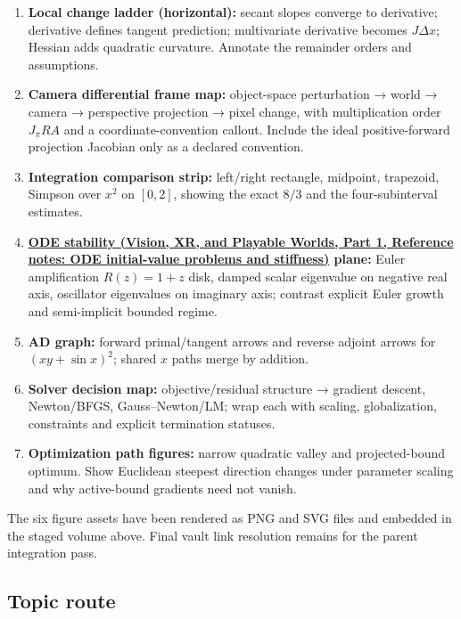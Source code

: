 \hypertarget{appendix-adf48f5dc5c1-figure-guide}{}

\begin{enumerate}
\def\labelenumi{\arabic{enumi}.}
\tightlist
\item
  \textbf{Local change ladder (horizontal):} secant slopes converge to derivative; derivative defines tangent prediction; multivariate derivative becomes \(J\Delta x\); Hessian adds quadratic curvature. Annotate the remainder orders and assumptions.
\item
  \textbf{Camera differential frame map:} object-space perturbation → world → camera → perspective projection → pixel change, with multiplication order \(J_\pi R A\) and a coordinate-convention callout. Include the ideal positive-forward projection Jacobian only as a declared convention.
\item
  \textbf{Integration comparison strip:} left/right rectangle, midpoint, trapezoid, Simpson over \(x^2\) on \([0,2]\), showing the exact \(8/3\) and the four-subinterval estimates.
\item
  \textbf{\href{../07-Vision-XR-and-Playable-Worlds-P01/main.pdf\#nameddest=appendix-e8ab9836882e}{ODE stability (Vision, XR, and Playable Worlds, Part 1, Reference notes: ODE initial-value problems and stiffness)} plane:} Euler amplification \(R(z)=1+z\) disk, damped scalar eigenvalue on negative real axis, oscillator eigenvalues on imaginary axis; contrast explicit Euler growth and semi-implicit bounded regime.
\item
  \textbf{AD graph:} forward primal/tangent arrows and reverse adjoint arrows for \((xy+\sin x)^2\); shared \(x\) paths merge by addition.
\item
  \textbf{Solver decision map:} objective/residual structure → gradient descent, Newton/BFGS, Gauss--Newton/LM; wrap each with scaling, globalization, constraints and explicit termination statuses.
\item
  \textbf{Optimization path figures:} narrow quadratic valley and projected-bound optimum. Show Euclidean steepest direction changes under parameter scaling and why active-bound gradients need not vanish.
\end{enumerate}

The six figure assets have been rendered as PNG and SVG files and embedded in the staged volume above. Final vault link resolution remains for the parent integration pass.

\subsection{Topic route}\label{appendix-adf48f5dc5c1-topic-route}

